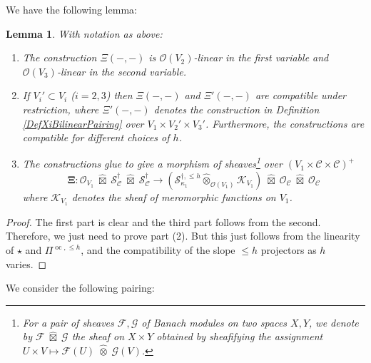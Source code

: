 \documentclass[10pt, oneside]{amsart}
\numberwithin{equation}{subsection}
\newtheorem{lemma}[equation]{Lemma}
\theoremstyle{definition}
\theoremstyle{remark}
\newcommand{\hatot}{\hat{\otimes}}
\newcommand{\opn}[1]{\operatorname{#1}}
\begin{document}
We have the following lemma:

\begin{lemma}
With notation as above:
\begin{enumerate}
    \item The construction $\Xi(-, -)$ is $\mathcal{O}(V_2)$-linear in the first variable and $\mathcal{O}(V_3)$-linear in the second variable.
    \item If $V_i' \subset V_i$ ($i = 2, 3$) then $\Xi(-, -)$ and $\Xi'(-, -)$ are compatible under restriction, where $\Xi'(-, -)$ denotes the construction in Definition \ref{DefXiBilinearPairing} over $V_1 \times V_2' \times V_3'$. Furthermore, the constructions are compatible for different choices of $h$.
    \item The constructions glue to give a morphism of sheaves\footnote{For a pair of sheaves $\mathcal{F}, \mathcal{G}$ of Banach modules on two spaces $X, Y$, we denote by $\mathcal{F} \; \hat{\boxtimes} \; \mathcal{G}$ the sheaf on $X \times Y$ obtained by sheafifying the assignment $U \times V \mapsto \mathcal{F}(U) \; \hat{\otimes} \; \mathcal{G}(V)$.} over $(V_1 \times \mathcal{C} \times \mathcal{C})^+$
    \[
    {\boldsymbol\Xi} \colon \mathcal{O}_{V_1} \;  \hat{\boxtimes} \; \mathcal{S}^{\dagger}_{\mathcal{C}} \; \hat{\boxtimes} \; \mathcal{S}^{\dagger}_{\mathcal{C}} \to (\mathscr{S}^{\dagger, \leq h}_{\kappa_1} \hatot_{\mathcal{O}(V_1)} \mathcal{K}_{V_1} ) \; \hat{\boxtimes} \; \mathcal{O}_{\mathcal{C}} \; \hat{\boxtimes} \; \mathcal{O}_{\mathcal{C}}
    \]
    where $\mathcal{K}_{V_1}$ denotes the sheaf of meromorphic functions on $V_1$.
\end{enumerate}
\end{lemma}
\begin{proof}
The first part is clear and the third part follows from the second. Therefore, we just need to prove part (2). But this just follows from the linearity of $\star$ and $\Pi^{\opn{oc}, \leq h}$, and the compatibility of the slope $\leq h$ projectors as $h$ varies.
\end{proof}

We consider the following pairing:
\end{document}
